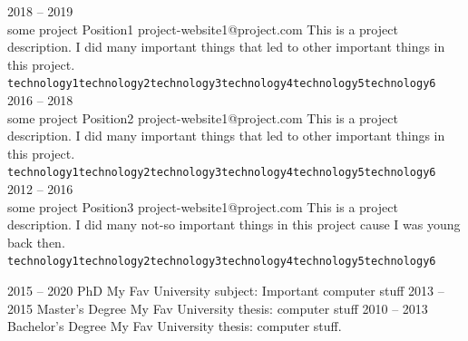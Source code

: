 \documentclass[9pt]{developercv} %
\begin{document}
\begin{tcolorbox}
\begin{tcolorbox}[colback=primary, 
			colframe=secondary_dark,
			width=\linewidth]
\begin{entrylist}
	\entry
		{2018 -- 2019\\\footnotesize{some project}} %
		{Position1} %
		{project-website1@project.com} %
		{This is a project description. I did many important things that led to other important things in this project.\\ \texttt{technology1}\slashsep\texttt{technology2}\slashsep\texttt{technology3}\slashsep\texttt{technology4}\slashsep\texttt{technology5}\slashsep\texttt{technology6}} %
		\entry
		{2016 -- 2018\\\footnotesize{some project}} %
		{Position2} %
		{project-website1@project.com} %
		{This is a project description. I did many important things that led to other important things in this project.\\ \texttt{technology1}\slashsep\texttt{technology2}\slashsep\texttt{technology3}\slashsep\texttt{technology4}\slashsep\texttt{technology5}\slashsep\texttt{technology6}} %
		\entry
		{2012 -- 2016\\\footnotesize{some project}} %
		{Position3} %
		{project-website1@project.com} %
		{This is a project description. I did many not-so important things in this project cause I was young back then.\\ \texttt{technology1}\slashsep\texttt{technology2}\slashsep\texttt{technology3}\slashsep\texttt{technology4}\slashsep\texttt{technology5}\slashsep\texttt{technology6}} %
\end{entrylist}

\end{tcolorbox}
\vspace{0.3cm}

\begin{tcolorbox}[colback=primary, 
			colframe=secondary_dark,
			width=\linewidth,
			flush right]
\vspace{-\baselineskip} 

\begin{entrylist}
	\entry
		{2015 -- 2020}
		{PhD}
		{My Fav University}
		{subject: Important computer stuff}
	\entry
		{2013 -- 2015}
		{Master's Degree}
		{My Fav University}
		{thesis: computer stuff}
	\entry
		{2010 -- 2013}
		{Bachelor's Degree}
		{My Fav University}
		{thesis: computer stuff.}
\end{entrylist}
\end{tcolorbox}
\end{tcolorbox}
\end{document}
